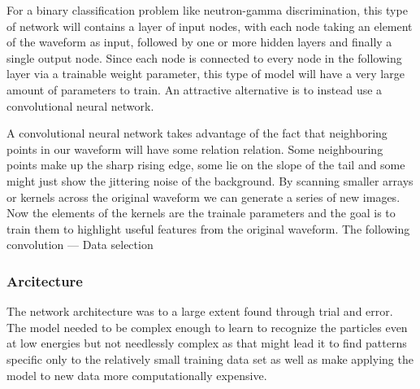 \documentclass[main.tex]{subfiles}
\begin{document}
For a binary classification problem like neutron-gamma discrimination, this type of network will contains a layer of input nodes, with each node taking an element of the waveform as input, followed by one or more hidden layers and finally a single output node. Since each node is connected to every node in the following layer via a trainable weight parameter, this type of model will have a very large amount of parameters to train. An attractive alternative is to instead use a convolutional neural network\cite{Goodfellow-et-al-2016}.

A convolutional neural network takes advantage of the fact that neighboring points in our waveform will have some relation relation. Some neighbouring points make up the sharp rising edge, some lie on the slope of the tail and some might just show the jittering noise of the background. By scanning smaller arrays or kernels across the original waveform we can generate a series of new images. Now the elements of the kernels are the trainale parameters and the goal is to train them to highlight useful features from the original waveform. The following convolution
---
Data selection

\subsubsection{Arcitecture}

The network architecture was to a large extent found through trial and error. The model needed to be complex enough to learn to recognize the particles even at low energies but not needlessly complex as that might lead it to find patterns specific only to the relatively small training data set as well as make applying the model to new data more computationally expensive. 
\end{document}
